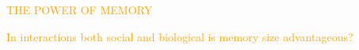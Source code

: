 \documentclass[usenames,dvipsnames,t]{beamer}
\begin{document}
\begin{columns}
    \begin{column}{.55\linewidth}
    \vspace{1.5cm}

    \centering
    \textcolor{orange}{\fontsize{110}{120} \selectfont THE POWER OF MEMORY}
    \vspace{0.7cm}

    \Large\textcolor{orange}{In interactions both social and biological is memory
    size advantageous?}
    \end{column}
    \begin{column}{.2\linewidth}
        
        \begin{center}
            
        \end{center}
        \end{column}
    \begin{column}{.23\linewidth}

        
    \end{column}
    \begin{column}{.02\linewidth}
    \end{column}
\end{columns}
\end{document}
